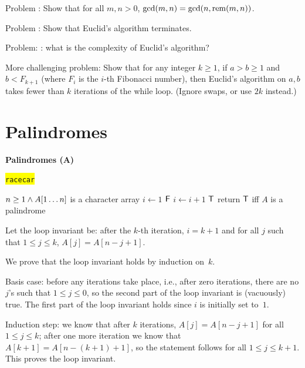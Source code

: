 \begin{frame}
Problem \fi: 
Show that for all $m,n>0$, $\gcd(m,n)=\gcd(n,\mathrm{rem}(m,n))$.

Problem \fi: Show that Euclid's algorithm terminates.

Problem: \else \fi:  what is the complexity of Euclid's algorithm?

{\color{blue}
More challenging problem: Show that for any integer $k\ge 1$, if
$a>b\ge 1$ and $b<F_{k+1}$ (where $F_i$ is the $i$-th Fibonacci
number), then Euclid's algorithm on $a,b$ takes fewer than $k$
iterations of the while loop. (Ignore swaps, or use $2k$ instead.)
}
\end{frame}

\section{Palindromes}

\begin{frame}
{\bf Palindromes (A\fi)}

\colorbox{yellow}{\tt racecar}

\bigskip

\begin{algorithmic}[1]
\REQUIRE $n\geq 1\wedge A[1\ldots n]$ is a character array
\STATE $i\leftarrow 1$ 
          \RETURN $\mathsf{F}$ 
      \ENDIF
\STATE $i\leftarrow i+1$ 
\ENDWHILE
\RETURN $\mathsf{T}$ 
\ENSURE return $\mathsf{T}$ iff $A$ is a palindrome
\end{algorithmic}

\end{frame}

\begin{frame}
Let the loop invariant be: after the $k$-th iteration, $i=k+1$ and for
all $j$ such that $1\le j\le k$, $A[j]=A[n-j+1]$. 

We prove that the
loop invariant holds by induction on~$k$.  

Basis case: before any
iterations take place, i.e., after zero iterations, there are no
$j$'s such that $1\le j\le 0$, so the second part of the loop
invariant is (vacuously) true.  The first part of the loop invariant
holds since $i$ is initially set to~$1$.

Induction step: we know that after $k$ iterations, $A[j]=A[n-j+1]$ for
all $1\le j\le k$; after one more iteration we know that
$A[k+1]=A[n-(k+1)+1]$, so the statement follows for all $1\le j\le
k+1$.  This proves the loop invariant.
\end{frame}


